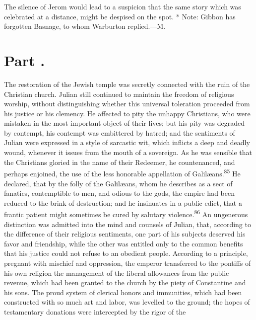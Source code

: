 
The silence of Jerom would lead to a suspicion that the same
story which was celebrated at a distance, might be despised on
the spot. * Note: Gibbon has forgotten Basnage, to whom Warburton
replied.—M.

\section{Part \thesection.}

The restoration of the Jewish temple was secretly connected with
the ruin of the Christian church. Julian still continued to
maintain the freedom of religious worship, without distinguishing
whether this universal toleration proceeded from his justice or
his clemency. He affected to pity the unhappy Christians, who
were mistaken in the most important object of their lives; but
his pity was degraded by contempt, his contempt was embittered by
hatred; and the sentiments of Julian were expressed in a style of
sarcastic wit, which inflicts a deep and deadly wound, whenever
it issues from the mouth of a sovereign. As he was sensible that
the Christians gloried in the name of their Redeemer, he
countenanced, and perhaps enjoined, the use of the less honorable
appellation of Galilæans.\textsuperscript{85} He declared, that by the folly of
the Galilæans, whom he describes as a sect of fanatics,
contemptible to men, and odious to the gods, the empire had been
reduced to the brink of destruction; and he insinuates in a
public edict, that a frantic patient might sometimes be cured by
salutary violence.\textsuperscript{86} An ungenerous distinction was admitted into
the mind and counsels of Julian, that, according to the
difference of their religious sentiments, one part of his
subjects deserved his favor and friendship, while the other was
entitled only to the common benefits that his justice could not
refuse to an obedient people. According to a principle, pregnant
with mischief and oppression, the emperor transferred to the
pontiffs of his own religion the management of the liberal
allowances from the public revenue, which had been granted to the
church by the piety of Constantine and his sons. The proud system
of clerical honors and immunities, which had been constructed
with so much art and labor, was levelled to the ground; the hopes
of testamentary donations were intercepted by the rigor of the
